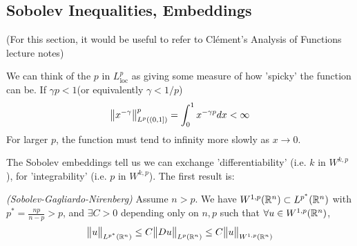 \documentclass[10pt,a4paper]{report}
\begin{document}
\subsection*{Sobolev Inequalities, Embeddings}

(For this section, it would be useful to refer to Cl\'{e}ment's Analysis of Functions lecture notes)
\s

We can think of the $p$ in $L^p_{\text{loc}}$ as giving some measure of how 'spicky' the function can be. If $\gamma p <1$(or equivalently $\gamma <1/p$)
\begin{align*}
\bigl\lVert x^{-\gamma}\bigr\rVert_{L^p((0,1])}^p = \int_0^1 x^{-\gamma p} dx < \infty
\end{align*}
For larger $p$, the function must tend to infinity more slowly as $x\rightarrow 0$.
\s

The Sobolev embeddings tell us we can exchange 'differentiability' (i.e. $k$ in $W^{k,p}$), for 'integrability' (i.e. $p$ in $W^{k,p}$). The first result is:
\s

\thm \emph{(Sobolev-Gagliardo-Nirenberg)} Assume $n>p$. We have $W^{1,p}(\mathbb{R}^n) \subset L^{p^*} (\mathbb{R}^n)$ with $p^* = \frac{np}{n-p}>p$, and $\exists C >0$ depending only on $n,p$ such that $\forall u \in W^{1,p}(\mathbb{R}^n)$,
\begin{align*}
\bigl\lVert u\bigr\rVert_{L^{p^*}(\mathbb{R}^n)} \leq C \bigl\lVert Du\bigr\rVert_{L^p(\mathbb{R}^n)} \leq C\bigl\lVert u\bigr\rVert_{W^{1,p}(\mathbb{R}^n)}
\end{align*}
\s
\end{document}
